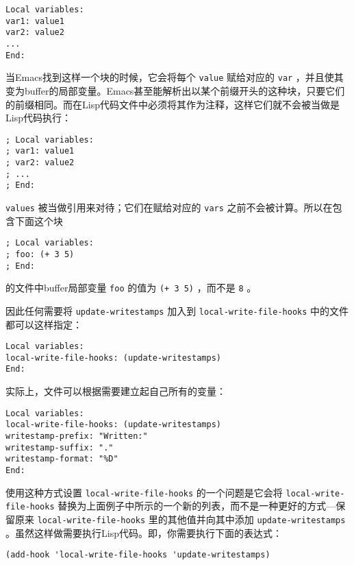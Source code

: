 \begin{verbatim}
Local variables:
var1: value1
var2: value2
...
End:
\end{verbatim}

当Emacs找到这样一个块的时候，它会将每个 \texttt{value} 赋给对应的 \texttt{var} ，并且使其变为buffer的局部变量。Emacs甚至能解析出以某个前缀开头的这种块，只要它们的前缀相同。而在Lisp代码文件中必须将其作为注释，这样它们就不会被当做是Lisp代码执行：

\begin{verbatim}
; Local variables:
; var1: value1
; var2: value2
; ...
; End:
\end{verbatim}

 \texttt{values} 被当做引用来对待；它们在赋给对应的 \texttt{vars} 之前不会被计算。所以在包含下面这个块

\begin{verbatim}
; Local variables:
; foo: (+ 3 5)
; End:
\end{verbatim}

的文件中buffer局部变量 \texttt{foo} 的值为 \texttt{(+ 3 5)} ，而不是 \texttt{8} 。

因此任何需要将 \texttt{update-writestamps} 加入到 \texttt{local-write-file-hooks} 中的文件都可以这样指定：

\begin{verbatim}
Local variables:
local-write-file-hooks: (update-writestamps)
End:
\end{verbatim}

实际上，文件可以根据需要建立起自己所有的变量：

\begin{verbatim}
Local variables:
local-write-file-hooks: (update-writestamps)
writestamp-prefix: "Written:"
writestamp-suffix: "."
writestamp-format: "%D"
End:
\end{verbatim}

使用这种方式设置 \texttt{local-write-file-hooks} 的一个问题是它会将 \texttt{local-write-file-hooks} 替换为上面例子中所示的一个新的列表，而不是一种更好的方式---保留原来 \texttt{local-write-file-hooks} 里的其他值并向其中添加 \texttt{update-writestamps} 。虽然这样做需要执行Lisp代码。即，你需要执行下面的表达式：

\begin{verbatim}
(add-hook 'local-write-file-hooks 'update-writestamps)
\end{verbatim}

